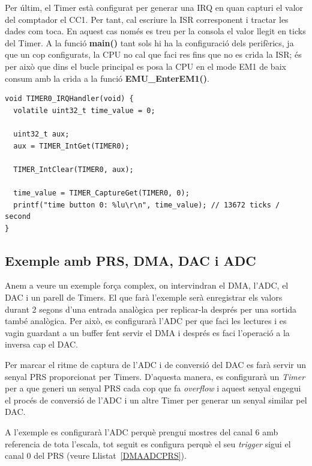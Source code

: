 Per últim, el Timer està configurat per generar una \gls{IRQ} en quan capturi el valor del comptador el CC1. Per tant, cal escriure la \gls{ISR} corresponent i tractar les dades com toca. En aquest cas només es treu per la consola el valor llegit en ticks del Timer. A la funció {\bf main()} tant sols hi ha la configuració dels perifèrics, ja que un cop configurats, la CPU no cal que faci res fins que no es crida la ISR; és per això que dins el bucle principal es posa la CPU en el mode EM1 de baix consum amb la crida a la funció {\bf EMU\_EnterEM1()}.

\begin{lstlisting}[style=customc,caption=ISR del Timer,label=PRSISR]
void TIMER0_IRQHandler(void) {
  volatile uint32_t time_value = 0;

  uint32_t aux;
  aux = TIMER_IntGet(TIMER0);

  TIMER_IntClear(TIMER0, aux);

  time_value = TIMER_CaptureGet(TIMER0, 0);
  printf("time button 0: %lu\r\n", time_value); // 13672 ticks / second
} 
\end{lstlisting}



\subsection{Exemple amb PRS, DMA, DAC i ADC}

Anem a veure un exemple força complex, on intervindran el DMA, l'ADC, el DAC i un parell de Timers. El que farà l'exemple serà enregistrar els valors durant 2 segons d'una entrada analògica per replicar-la després per una sortida també analògica. Per això, es configurarà l'ADC per que faci les lectures i es vagin guardant a un buffer fent servir el DMA i després es faci l'operació a la inversa cap el DAC.

Per marcar el ritme de captura de l'ADC i de conversió del DAC es farà servir un senyal PRS proporcionat per Timers. D'aquesta manera, es configurarà un {\em Timer} per a que generi un senyal PRS cada cop que fa {\em overflow} i aquest senyal engegui el procés de conversió de l'ADC i un altre Timer per generar un senyal similar pel DAC.

A l'exemple es configurarà l'ADC perquè prengui mostres del canal 6 amb referencia de tota l'escala, tot seguit es configura perquè el seu {\em trigger} sigui el canal 0 del PRS (veure Llistat~\ref{DMAADCPRS}).

